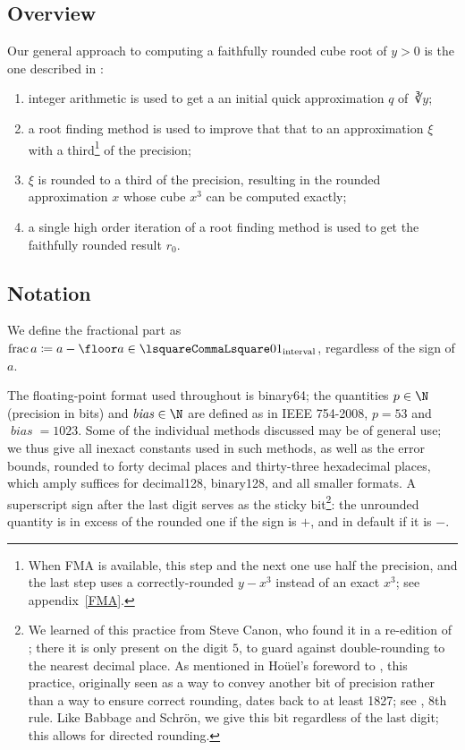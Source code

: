 ﻿\documentclass[10pt, a4paper, twoside]{basestyle}
\DeclareMathOperator{\bias}{\mathit{bias}}
\begin{document}
\subsection*{Overview}
Our general approach to computing a faithfully rounded cube root of $y>0$ is the one described in \cite{KahanBindel2001}:
\begin{enumerate}
\item integer arithmetic is used to get a an initial quick approximation $q$ of $\cuberoot y$;
\item a root finding method is used to improve that that to an approximation $ξ$ with a \cbstart{}third\footnote{When FMA is available,
this step and the next one use half the precision, and the last step uses a correctly-rounded $y-x^3$ instead of an
exact $x^3$; see appendix~\ref{FMA}.}\cbend{} of the precision;
\item $ξ$ is rounded to a third of the precision, resulting in the rounded approximation $x$ whose cube $x^3$ can be computed exactly;
\item a single high order iteration of a root finding method is used to get the faithfully rounded result $r_0$.
\end{enumerate} 

\subsection*{Notation}
We define the fractional part as $\FractionalPart a\DefineAs a-\Floor a\in\intclop{0}{1}$, regardless of the sign of $a$.

The floating-point format used throughout is binary64; the quantities $p\in\N$ (precision in bits) and $\bias\in\N$ are 
defined as in IEEE 754-2008, $p=53$ and $\bias=1023$.
Some of the individual methods discussed may be of general use; we thus give all inexact constants used in such methods, as well as the error bounds, rounded to forty decimal places and thirty-three
hexadecimal places, which amply suffices for decimal128, binary128, and all smaller formats. A
superscript sign after the last digit serves as the sticky bit\footnote{We learned of this practice
from Steve Canon, who found it in a re-edition of \cite[VIII]{Bruhns1870}; there it is only present
on the digit $5$, to guard against double-rounding to the nearest decimal place.
As mentioned in Hoüel's foreword to \cite[II]{Schrön1873}, this practice, originally seen as a way to
convey another bit of precision rather than a way to ensure correct rounding, dates back to at least
1827; see \cite[X]{Babbage1827}, 8th rule. Like Babbage and Schrön, we give this bit regardless of
the last digit; this allows for directed rounding.}:
the unrounded quantity is in excess of the rounded one if the sign is $+$,
and in default if it is $-$.
\end{document}
